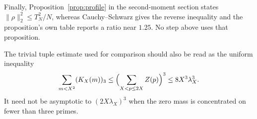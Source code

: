 Finally, Proposition~\ref{prop:profile} in the second-moment section states
$\|\rho\|_2^2\le T_N^2/N$, whereas Cauchy--Schwarz gives the reverse
inequality and the proposition's own table reports a ratio near $1.25$.
No step above uses that proposition.

The trivial tuple estimate used for comparison should also be read as the
uniform inequality
\[
  \sum_{m<X^2}(K_X(m))_3
  \le\Bigl(\sum_{X<p\le2X}Z(p)\Bigr)^3
  \le8X^3\lambda_X^3.
\]
It need not be asymptotic to $(2X\lambda_X)^3$ when the zero mass is
concentrated on fewer than three primes.

